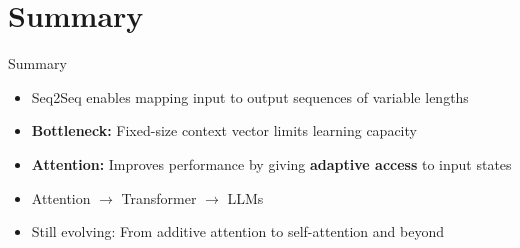 \section{Summary}
\begin{frame}{Summary}
  \begin{itemize}
    \item[$\blacktriangleright$] Seq2Seq enables mapping input to output sequences of variable lengths
    \item[$\blacktriangleright$] \textbf{Bottleneck:} Fixed-size context vector limits learning capacity
    \item[$\blacktriangleright$] \textbf{Attention:} Improves performance by giving \textbf{adaptive access} to input states
    \item[$\blacktriangleright$] Attention $\rightarrow$ Transformer $\rightarrow$ LLMs
    \item[$\blacktriangleright$] Still evolving: From additive attention to self-attention and beyond
  \end{itemize}
\end{frame}